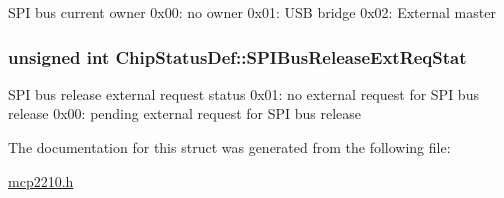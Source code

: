 \-S\-P\-I bus current owner 0x00\-: no owner 0x01\-: \-U\-S\-B bridge 0x02\-: \-External master \hypertarget{struct_chip_status_def_ac1422f04b7345187a77b5d506dc8a492}{
\subsubsection[{\-S\-P\-I\-Bus\-Release\-Ext\-Req\-Stat}]{\setlength{\rightskip}{0pt plus 5cm}unsigned int {\bf \-Chip\-Status\-Def\-::\-S\-P\-I\-Bus\-Release\-Ext\-Req\-Stat}}}\label{struct_chip_status_def_ac1422f04b7345187a77b5d506dc8a492}
\-S\-P\-I bus release external request status 0x01\-: no external request for \-S\-P\-I bus release 0x00\-: pending external request for \-S\-P\-I bus release 

\-The documentation for this struct was generated from the following file\-:\begin{DoxyCompactItemize}
\item 
\hyperlink{mcp2210_8h}{mcp2210.\-h}\end{DoxyCompactItemize}
